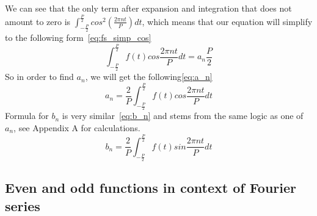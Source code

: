 \documentclass[titlepage]{article}
\begin{document}
    We can see that the only term after expansion and integration that does not 
    amount to zero is $\int_{-\frac{P}{2}}^{\frac{P}{2}}cos^2(\frac{2\pi nt}{P})dt$,
    which means that our equation will simplify to the following form~\eqref{eq:fs_simp_cos}
    \begin{equation}\label{eq:fs_simp_cos}
        \int_{-\frac{P}{2}}^{\frac{P}{2}}f(t)cos\frac{2\pi nt}{P}dt = a_n\frac{P}{2}
    \end{equation}
    So in order to find $a_n$, we will get the following\eqref{eq:a_n}
    \begin{equation}\label{eq:a_n}
        a_n = \frac{2}{P}\int_{-\frac{P}{2}}^{\frac{P}{2}}f(t)cos\frac{2\pi nt}{P}dt
    \end{equation}
    Formula for $b_n$ is very similar~\eqref{eq:b_n} and stems from the same logic as one of 
    $a_n$, see Appendix A for calculations.
    \begin{equation}\label{eq:b_n}
        b_n = \frac{2}{P}\int_{-\frac{P}{2}}^{\frac{P}{2}}f(t)sin\frac{2\pi nt}{P}dt
    \end{equation}

\subsection{Even and odd functions in context of Fourier series}
\end{document}

